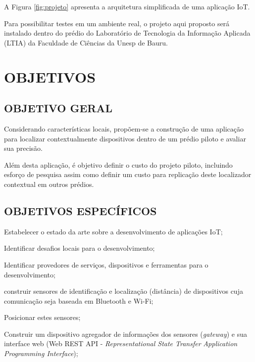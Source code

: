 \documentclass[
	12pt,				%
	openright,			%
	oneside,			%
	a4paper,			%
	chapter=TITLE,		%
	english,			%
	french,				%
	spanish,			%
	brazil				%
	]{abntex2}
\begin{document}
{A Figura \ref{fig:projeto} apresenta a arquitetura simplificada de uma aplicação
IoT.

Para possibilitar testes em um ambiente real, o projeto aqui proposto será
instalado dentro do prédio do Laboratório de Tecnologia da Informação Aplicada
(LTIA) da Faculdade de Ciências da Unesp de Bauru.

\chapter{OBJETIVOS}
\label{chap:OBJETIVOS}

\section{OBJETIVO GERAL}
\label{sec:OBJETIVO GERAL}

Considerando características locais, propõem-se a construção de uma aplicação
para localizar contextualmente dispositivos dentro de um prédio piloto e avaliar
sua precisão.

Além desta aplicação, é objetivo definir o custo do projeto piloto, incluindo
esforço de pesquisa assim como definir um custo para replicação deste
localizador contextual em outros prédios.

\section{OBJETIVOS ESPECÍFICOS}
\label{sec:OBJETIVOS ESPECÍFICOS}

\begin{alineas}

	\item Estabelecer o estado da arte sobre a desenvolvimento de aplicações IoT;

	\item Identificar desafios locais para o desenvolvimento;

	\item Identificar provedores de serviços, dispositivos e ferramentas para o
desenvolvimento;

	\item construir sensores de identificação e localização (distância) de
 dispositivos cuja comunicação seja baseada em Bluetooth e Wi-Fi;

	\item Posicionar estes sensores;

	\item Construir um dispositivo agregador de informações dos sensores
 (\textit{gateway}) e sua interface web (Web REST API - \textit{Representational
State Transfer} \textit{Application Programming Interface});


\end{alineas}}
\end{document}
